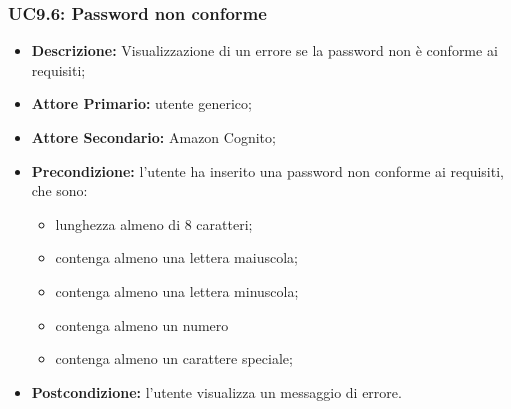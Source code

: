 \subsubsection{UC9.6: Password non conforme}
\label{sec:UC9.6}
\begin{itemize}
    \item \textbf{Descrizione:} Visualizzazione di un errore se la password non è conforme ai requisiti;
    \item \textbf{Attore Primario:} utente generico;
    \item \textbf{Attore Secondario:} Amazon Cognito;
    \item \textbf{Precondizione:} l'utente ha inserito una password non conforme ai requisiti, che sono:
          \begin{itemize}
              \item lunghezza almeno di 8 caratteri;
              \item contenga almeno una lettera maiuscola;
              \item contenga almeno una lettera minuscola;
              \item contenga almeno un numero
              \item contenga almeno un carattere speciale;
          \end{itemize}
    \item \textbf{Postcondizione:} l'utente visualizza un messaggio di errore.
\end{itemize}